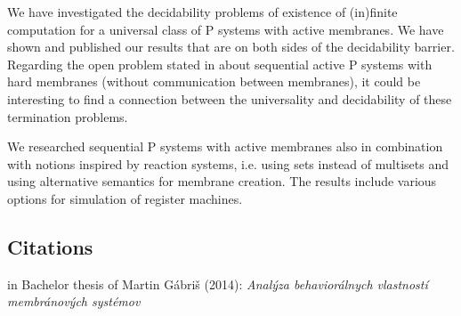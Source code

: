 \documentclass[a4paper,12pt,oneside,openany]{article}
\begin{document}
We have investigated the decidability problems of existence of (in)finite
computation for a universal class of P systems with active membranes.
We have shown and published\cite{Kovac15Termination} our results that are on both sides of the
decidability barrier. Regarding the open problem stated in about
sequential active P systems with hard membranes (without
communication between membranes), it could be interesting to find a
connection between the universality and decidability of these termination
problems.

We researched sequential P systems with active membranes also in
combination with notions inspired by reaction systems, i.e. using sets
instead of multisets and using alternative semantics for membrane creation.
The results include various options for simulation of register machines\cite{Kovac15SequentialActiveSet}.

\begin{bibunit}[plain]
\nocite{*}
\renewcommand{\refname}{Bibliography}
\putbib[autoreferat]
\end{bibunit}
\begin{bibunit}[plain]
\nocite{*}
\renewcommand{\refname}{Own publications}
\section*{Citations}
\cite{Kovac14Inhibitors} in Bachelor thesis of Martin Gábriš (2014): {\em Analýza behaviorálnych vlastností membránových systémov}
\end{bibunit}
\end{document}
